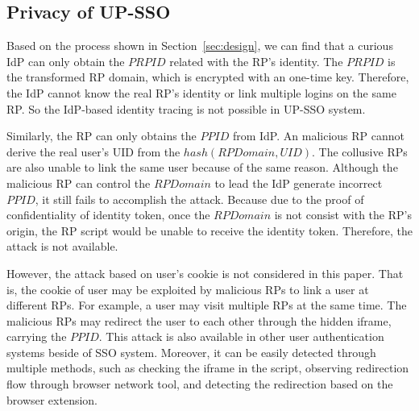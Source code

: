 \subsection{Privacy of UP-SSO}
Based on the process shown in Section~\ref{sec:design}, we can find that a curious IdP can only obtain the $PRPID$ related with the RP's identity. The $PRPID$ is the transformed RP domain, which is encrypted with an one-time key. Therefore, the IdP cannot know the real RP's identity or link multiple logins on the same RP. So the IdP-based identity tracing is not possible in UP-SSO system. 

Similarly, the RP can only obtains the $PPID$ from IdP. An malicious RP cannot derive the real user's UID from the $hash(RPDomain, UID)$. The collusive RPs are also unable to link the same user because of the same reason. Although the malicious RP can control the $RPDomain$ to lead the IdP generate incorrect $PPID$, it still fails to accomplish the attack. Because due to the proof of confidentiality of identity token, once the $RPDomain$ is not consist with the RP's origin, the RP script would be unable to receive the identity token. Therefore, the attack is not available. 

However, the attack based on user's cookie is not considered in this paper. That is, the cookie of user may be exploited by malicious RPs to link a user at different RPs. For example, a user may visit multiple RPs at the same time. The malicious RPs may redirect the user to each other through the hidden iframe, carrying the $PPID$. This attack is also available in other user authentication systems beside of SSO system. Moreover, it can be easily detected through multiple methods, such as checking the iframe in the script, observing redirection flow through browser network tool, and detecting the redirection based on the browser extension.



























